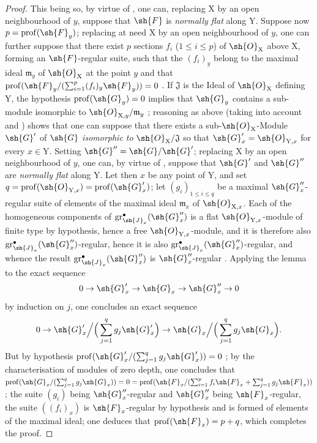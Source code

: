 \begin{proof}
This being so, by virtue of , one can, replacing $\mathrm{X}$ by an open neighbourhood of $y$, suppose that $\sh{F}$ is \emph{normally flat} along $\mathrm{Y}$. Suppose now $p=\operatorname{prof}(\sh{F}_y)$; replacing at need $\mathrm{X}$ by an open neighbourhood of $y$, one can further suppose that there exist $p$ sections $f_i$ ($1\leqslant i\leqslant p$) of $\sh{O}_\mathrm{X}$ above $\mathrm{X}$, forming an $\sh{F}$-regular suite, such that the $(f_i)_y$ belong to the maximal ideal $\mathfrak{m}_y$ of $\sh{O}_{\mathrm{X}}$ at the point $y$ and that $\operatorname{prof}(\sh{F}_y/(\sum_{i=1}^p (f_i)_y\sh{F}_y))=0$ . If $\mathfrak{J}$ is the Ideal of $\sh{O}_\mathrm{X}$ defining $\mathrm{Y}$, the hypothesis $\operatorname{prof}(\sh{G}_y)=0$ implies that $\sh{G}_y$ contains a sub-module isomorphic to $\sh{O}_{\mathrm{X},y}/\mathfrak{m}_y$ ; reasoning as above (taking into account  and ) shows that one can suppose that there exists a sub-$\sh{O}_\mathrm{X}$-Module $\sh{G}'$ of $\sh{G}$ \emph{isomorphic to} $\sh{O}_\mathrm{X}/\mathfrak{J}$ so that $\sh{G}'_x=\sh{O}_{\mathrm{Y},x}$ for every $x\in\mathrm{Y}$. Setting $\sh{G}''=\sh{G}/\sh{G}'$; replacing $\mathrm{X}$ by an open neighbourhood of $y$, one can, by virtue of , suppose that $\sh{G}'$ and $\sh{G}''$ are \emph{normally flat} along $\mathrm{Y}$. Let then $x$ be any point of $\mathrm{Y}$, and set $q=\operatorname{prof}(\sh{O}_{\mathrm{Y},x})=\operatorname{prof}(\sh{G}'_x)$; let $(g_i)_{1\leqslant i\leqslant q}$ be a maximal $\sh{G}''_x$-regular suite of elements of the maximal ideal $\mathfrak{m}_x$ of $\sh{O}_{\mathrm{X},x}$. Each of the homogeneous components of $\operatorname{gr}^{\bullet}_{\sh{J}_x}(\sh{G}''_x)$ is a flat $\sh{O}_{\mathrm{Y},x}$-module of finite type by hypothesis, hence a free $\sh{O}_{\mathrm{Y},x}$-module, and it is therefore also $\operatorname{gr}^{\bullet}_{\sh{J}_x}(\sh{G}''_x)$-regular, hence it is also $\operatorname{gr}^{\bullet}_{\sh{J}_x}(\sh{G}''_x)$-regular, and whence the result $\operatorname{gr}^{\bullet}_{\sh{J}_x}(\sh{G}''_x)$ is $\sh{G}''_x$-regular . Applying the lemma  to the exact sequence
\[
0\to\sh{G}'_x\to\sh{G}_x\to\sh{G}''_x\to 0
\]
by induction on $j$, one concludes an exact sequence
\[
0\to\sh{G}'_x\Big/\Big(\sum_{j=1}^q g_j\sh{G}'_x\Big)\to\sh{G}_x\Big/\Big(\sum_{j=1}^q g_j\sh{G}_x\Big).
\]
But by hypothesis $\operatorname{prof}(\sh{G}'_x/(\sum_{j=1}^q g_j\sh{G}'_x))=0$ ; by the characterisation of modules of zero depth, one concludes that $\operatorname{prof}(\sh{G}_x/(\sum_{j=1}^q g_j\sh{G}_x))=0=\operatorname{prof}(\sh{F}_x/(\sum_{i=1}^p f_i\sh{F}_x+\sum_{j=1}^q g_j\sh{F}_x))$; the suite $(g_i)$ being $\sh{G}''_x$-regular and $\sh{G}''_x$ being $\sh{F}_x$-regular, the suite $((f_i)_x)$ is $\sh{F}_x$-regular by hypothesis and is formed of elements of the maximal ideal; one deduces  that $\operatorname{prof}(\sh{F}_x)=p+q$, which completes the proof.
\end{proof}


